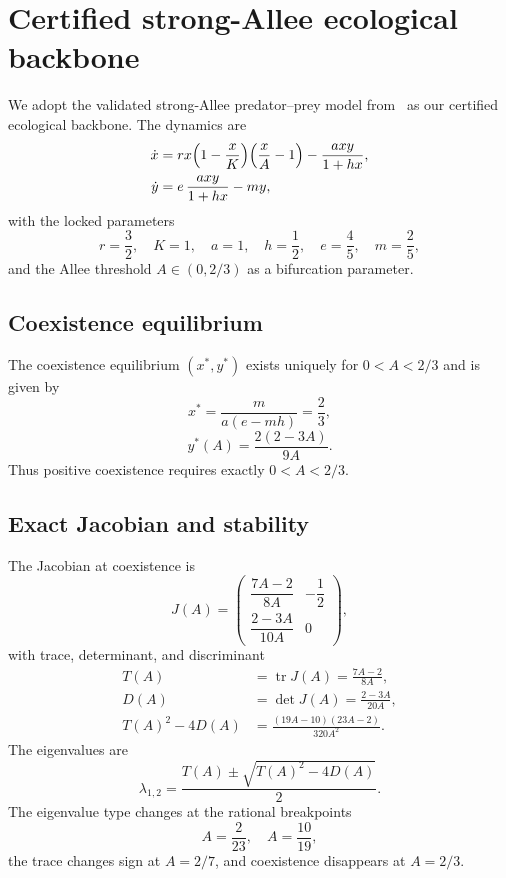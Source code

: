 \section{Certified strong-Allee ecological backbone}

We adopt the validated strong-Allee predator--prey model from~\cite[Sec.~4]{source_pack/04_EXACT_STRONG_ALLEE_BASELINE.md} as our certified ecological backbone. The dynamics are
\begin{align}
\dot x &= r x\Bigl(1-\frac{x}{K}\Bigr)\Bigl(\frac{x}{A}-1\Bigr)-\frac{a x y}{1+h x},\\
\dot y &= e\,\frac{a x y}{1+h x}-m y,
\end{align}
with the locked parameters
\[
r=\frac32,\quad K=1,\quad a=1,\quad h=\frac12,\quad e=\frac45,\quad m=\frac25,
\]
and the Allee threshold \(A\in(0,2/3)\) as a bifurcation parameter.

\subsection{Coexistence equilibrium}
The coexistence equilibrium \((x^*,y^*)\) exists uniquely for \(0<A<2/3\) and is given by
\begin{equation}
\label{eq:xstar}
x^*=\frac{m}{a(e-mh)}=\frac23,
\end{equation}
\begin{equation}
\label{eq:ystar}
y^*(A)=\frac{2(2-3A)}{9A}.
\end{equation}
Thus positive coexistence requires exactly \(0<A<2/3\).

\subsection{Exact Jacobian and stability}
The Jacobian at coexistence is
\begin{equation}
\label{eq:J}
J(A)=\begin{pmatrix}
\dfrac{7A-2}{8A} & -\dfrac12 \\[1ex]
\dfrac{2-3A}{10A} & 0
\end{pmatrix},
\end{equation}
with trace, determinant, and discriminant
\begin{align}
T(A)&=\operatorname{tr}J(A)=\frac{7A-2}{8A},\label{eq:trace}\\
D(A)&=\det J(A)=\frac{2-3A}{20A},\label{eq:det}\\
T(A)^2-4D(A)&=\frac{(19A-10)(23A-2)}{320A^2}.\label{eq:disc}
\end{align}
The eigenvalues are
\[
\lambda_{1,2}=\frac{T(A)\pm\sqrt{T(A)^2-4D(A)}}{2}.
\]
The eigenvalue type changes at the rational breakpoints
\[
A=\frac{2}{23},\quad A=\frac{10}{19},
\]
the trace changes sign at \(A=2/7\), and coexistence disappears at \(A=2/3\).

